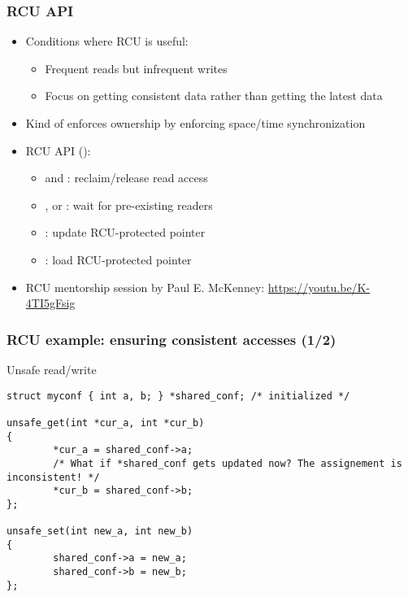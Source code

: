 \begin{frame}[fragile]
  \frametitle{RCU API}
  \begin{itemize}
  \item Conditions where RCU is useful:
    \begin{itemize}
    \item Frequent reads but infrequent writes
    \item Focus on getting consistent data rather than getting the
      latest data
    \end{itemize}
  \item Kind of enforces ownership by enforcing space/time synchronization
  \item RCU API ():
    \begin{itemize}
    \item {} and :
      reclaim/release read access
    \item {},  or : wait for
      pre-existing readers
    \item {}: update RCU-protected pointer
    \item {}: load RCU-protected pointer
    \end{itemize}
  \item RCU mentorship session by Paul E. McKenney:
    \url{https://youtu.be/K-4TI5gFsig}
  \end{itemize}
\end{frame}

\begin{frame}[fragile]
  \frametitle{RCU example: ensuring consistent accesses (1/2)}
    \begin{block}{Unsafe read/write}
      \begin{verbatim}
struct myconf { int a, b; } *shared_conf; /* initialized */

unsafe_get(int *cur_a, int *cur_b)
{
        *cur_a = shared_conf->a;
        /* What if *shared_conf gets updated now? The assignement is inconsistent! */
        *cur_b = shared_conf->b;
};

unsafe_set(int new_a, int new_b)
{
        shared_conf->a = new_a;
        shared_conf->b = new_b;
};
    \end{verbatim}
  \end{block}
\end{frame}


